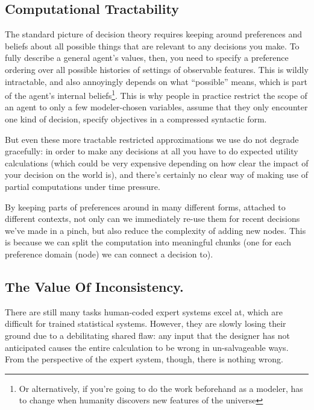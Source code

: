 \documentclass{article}
\begin{document}
	\subsection{Computational Tractability}
	
	The standard picture of decision theory requires keeping around preferences and beliefs about all possible things that are relevant to any decisions you make.  To fully describe a general agent's values, then, you need to specify a preference ordering over all possible histories of settings of observable features. This is wildly intractable, and also annoyingly depends on what ``possible'' means, which is part of the agent's internal beliefs\footnote{Or alternatively, if you're going to do the work beforehand as a modeler, has to change when humanity discovers new features of the universe}. This is why people in practice restrict the scope of an agent to only a few modeler-chosen variables, assume that they only encounter one kind of decision, specify objectives in a compressed syntactic form.
	
	But even these more tractable restricted approximations we use do not degrade gracefully: in order to make any decisions at all you have to do expected utility calculations (which could be very expensive depending on how clear the impact of your decision on the world is), and there's certainly no clear way of making use of partial computations under time pressure.
	
	{\color{green!30!black} By keeping parts of preferences around in many different forms, attached to different contexts, not only can we immediately re-use them for recent decisions we've made in a pinch, but also reduce the complexity of adding new nodes. This is because we can split the computation into meaningful chunks (one for each preference domain (node) we can connect a decision to).}
	
	
	\subsection{The Value Of Inconsistency.}	
	
	There are still many tasks human-coded expert systems excel at, which are difficult for trained statistical systems. However, they are slowly losing their ground due to a debilitating shared flaw: any input that the designer has not anticipated causes the entire calculation to be wrong in un-salvageable ways. From the perspective of the expert system, though, there is nothing wrong. 
	
\end{document}
